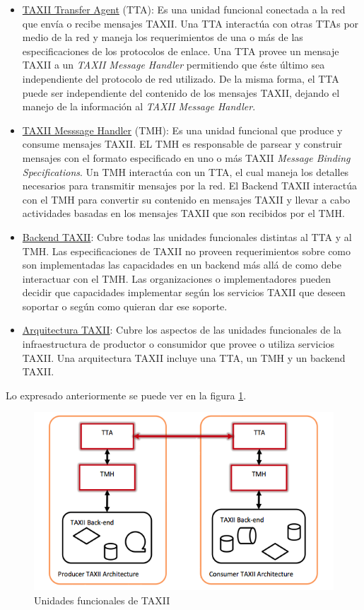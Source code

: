 \begin{itemize}
  \item \underline{TAXII Transfer Agent} (TTA): Es una unidad funcional conectada a la red 
  que envía o recibe mensajes TAXII. Una TTA interactúa con otras TTAs por medio 
  de la red y maneja los requerimientos de una o más de las especificaciones de 
  los protocolos de enlace. Una TTA provee un mensaje TAXII a un \textit{TAXII Message 
  Handler} permitiendo que éste último sea independiente del protocolo de red 
  utilizado. De la misma forma, el TTA puede ser independiente del contenido de 
  los mensajes TAXII, dejando el manejo de la información al \textit{TAXII Message 
  Handler}.
  \item \underline{TAXII Messsage Handler} (TMH): Es una unidad funcional que produce y 
  consume mensajes TAXII. EL TMH es responsable de parsear y construir mensajes 
  con el formato especificado en uno o más TAXII \textit{Message Binding Specifications}. 
  Un TMH interactúa con un TTA, el cual maneja los detalles necesarios para 
  transmitir mensajes por la red. El Backend TAXII interactúa con el TMH para 
  convertir su contenido en mensajes TAXII y llevar a cabo actividades basadas 
  en los mensajes TAXII que son recibidos por el TMH.
  \item \underline{Backend TAXII}: Cubre todas las unidades funcionales distintas al TTA y 
  al TMH. Las especificaciones de TAXII no proveen requerimientos sobre como son 
  implementadas las capacidades en un backend más allá de como debe interactuar 
  con el TMH. Las organizaciones o implementadores pueden decidir que 
  capacidades implementar según los servicios TAXII que deseen soportar o según 
  como quieran dar ese soporte.
  \item \underline{Arquitectura TAXII}: Cubre los aspectos de las unidades funcionales de la 
  infraestructura de productor o consumidor que provee o utiliza servicios 
  TAXII. Una arquitectura TAXII incluye una TTA, un TMH y un backend TAXII.
  \end{itemize}

Lo expresado anteriormente se puede ver en la figura \ref{fig.unidades_funcionales}.

\begin{figure}[ht!]
  \centering
    \includegraphics[width=150mm]{./images/TAXIIArchitecture.png}
    \caption{Unidades funcionales de TAXII \protect\cite{b1}}
    \label{fig.unidades_funcionales}
\end{figure}

